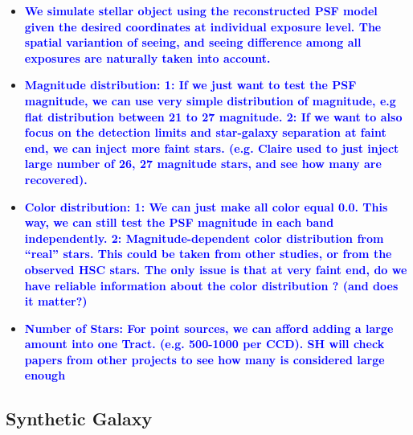 \documentclass{pasj01}
\newcommand{\plan}[1]{\textcolor{blue} {\textbf{#1}}}
\begin{document}
    \begin{itemize}
        \item \plan{We simulate stellar object using the reconstructed PSF model given 
                    the desired coordinates at individual exposure level.  
                    The spatial variantion of seeing, and seeing difference among all 
                    exposures are naturally taken into account.}
        \item \plan{\textbf{Magnitude distribution}:
                    1: If we just want to test the PSF magnitude, we can use very 
                           simple distribution of magnitude, e.g flat distribution 
                           between 21 to 27 magnitude.
                    2: If we want to also focus on the detection limits and 
                           star-galaxy separation at faint end, we can inject more 
                           faint stars.  (e.g. Claire used to just inject large number 
                           of 26, 27 magnitude stars, and see how many are recovered).}
        \item \plan{\textbf{Color distribution}:
                    1: We can just make all color equal 0.0. This way, we can still 
                       test the PSF magnitude in each band independently.
                    2: Magnitude-dependent color distribution from ``real'' stars. 
                       This could be taken from other studies, or from the observed
                       HSC stars.  The only issue is that at very faint end, do we have
                       reliable information about the color distribution ? 
                       (and does it matter?)}
        \item \plan{\textbf{Number of Stars}:
                    For point sources, we can afford adding a large amount into one Tract. 
                    (e.g. 500-1000 per CCD). 
                    SH will check papers from other projects to see how many is considered 
                    large enough}
    \end{itemize}
    
    
\subsection{Synthetic Galaxy}
\end{document}
